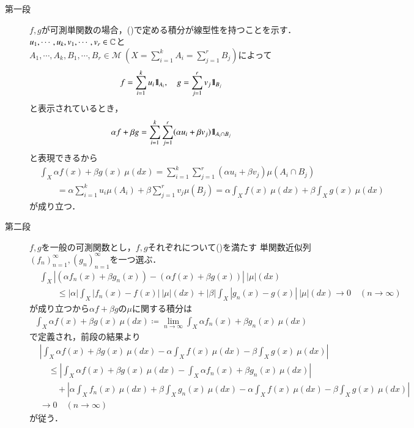 	\begin{prf}\mbox{}
		\begin{description}
			\item[第一段]
				$f,g$が可測単関数の場合，()で定める積分が線型性を持つことを示す．
				$u_1,\cdots,u_k,v_1,\cdots,v_r \in \mathbb{C}$と$A_1,\cdots,A_k,B_1,\cdots,B_r \in \mathcal{M}\ (X = \sum_{i=1}^{k} A_i = \sum_{j=1}^{r} B_j)$によって
				\begin{align}
					f = \sum_{i=1}^{k} u_i \mbox{1}\hspace{-0.25em}\mbox{l}_{A_i},
					\quad g = \sum_{j=1}^{r} v_j \mbox{1}\hspace{-0.25em}\mbox{l}_{B_j}
				\end{align}
				と表示されているとき，
				\begin{align}
					\alpha f + \beta g = \sum_{i=1}^{k} \sum_{j=1}^{r} (\alpha u_i + \beta v_j) \mbox{1}\hspace{-0.25em}\mbox{l}_{A_i \cap B_j}
				\end{align}
				と表現できるから
				\begin{align}
					&\int_X \alpha f(x) + \beta g(x)\ \mu(dx) 
					= \sum_{i=1}^{k} \sum_{j=1}^{r} (\alpha u_i + \beta v_j) \mu(A_i \cap B_j) \\
					&\qquad = \alpha \sum_{i=1}^{k} u_i \mu(A_i) + \beta \sum_{j=1}^{r} v_j \mu(B_j)
					= \alpha \int_X f(x)\ \mu(dx) + \beta \int_X g(x)\ \mu(dx)
				\end{align}
				が成り立つ．
			\item[第二段]
				$f,g$を一般の可測関数とし，$f,g$それぞれについて()を満たす
				単関数近似列$(f_n)_{n=1}^{\infty},(g_n)_{n=1}^{\infty}$を一つ選ぶ．
				\begin{align}
					&\int_X \left|(\alpha f_n(x) + \beta g_n(x)) - (\alpha f(x) + \beta g(x)) \right|\ |\mu|(dx) \\
					&\qquad \leq |\alpha| \int_X \left| f_n(x) - f(x) \right|\ |\mu|(dx)
						+ |\beta| \int_X \left| g_n(x) - g(x) \right|\ |\mu|(dx)
					\longrightarrow 0 \quad (n \longrightarrow \infty)
				\end{align}
				が成り立つから$\alpha f + \beta g$の$\mu$に関する積分は
				\begin{align}
					\int_X \alpha f(x) + \beta g(x)\ \mu(dx) \coloneqq \lim_{n \to \infty} \int_X \alpha f_n(x) + \beta g_n(x)\ \mu(dx)
				\end{align}
				で定義され，前段の結果より
				\begin{align}
					&\left| \int_X \alpha f(x) + \beta g(x)\ \mu(dx) - \alpha \int_X f(x)\ \mu(dx) - \beta \int_X g(x)\ \mu(dx) \right| \\
					&\quad\leq \left| \int_X \alpha f(x) + \beta g(x)\ \mu(dx) - \int_X \alpha f_n(x) + \beta g_n(x)\ \mu(dx) \right| \\
						&\qquad+ \left| \alpha \int_X f_n(x)\ \mu(dx) + \beta \int_X g_n(x)\ \mu(dx) - \alpha \int_X f(x)\ \mu(dx) - \beta \int_X g(x)\ \mu(dx) \right| \\
					&\longrightarrow 0 \quad (n \longrightarrow \infty)
				\end{align}
				が従う．
				\QED
		\end{description}
	\end{prf}
	
